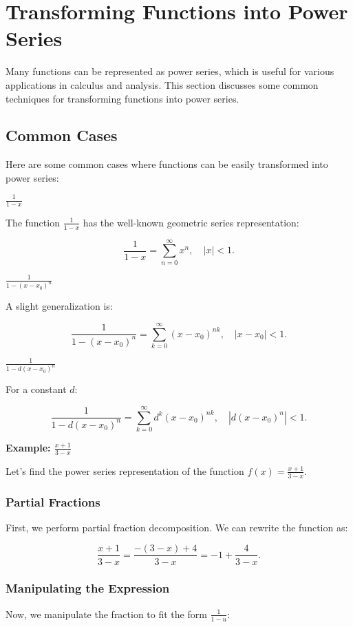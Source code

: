 \newpage
\section{Transforming Functions into Power Series}

Many functions can be represented as power series, which is useful for various applications in calculus 
and analysis. This section discusses some common techniques for transforming functions into power series.

\subsection{Common Cases}
Here are some common cases where functions can be easily transformed into power series:

\(\frac{1}{1 - x}\)

The function \(\frac{1}{1 - x}\) has the well-known geometric series representation:

\[
    \frac{1}{1 - x} = \sum_{n=0}^{\infty} x^n, \quad |x| < 1.
\]

\(\frac{1}{1 - {(x - x_0)}^n}\)

A slight generalization is:

\[
    \frac{1}{1 - {(x - x_0)}^n} = \sum_{k=0}^{\infty} {(x - x_0)}^{nk}, \quad |x - x_0| < 1.
\]

\(\frac{1}{1 - d{(x - x_0)}^n}\)

For a constant \(d\):

\[
    \frac{1}{1 - d{(x - x_0)}^n} = \sum_{k=0}^{\infty} d^k {(x - x_0)}^{nk}, \quad |d{(x - x_0)}^n| < 1.
\]

\textbf{Example: \(\frac{x + 1}{3 - x}\)}

Let's find the power series representation of the function \(f(x) = \frac{x + 1}{3 - x}\).

\subsubsection{Partial Fractions}

First, we perform partial fraction decomposition. We can rewrite the function as:

\[
    \frac{x + 1}{3 - x} = \frac{-(3 - x) + 4}{3 - x} = -1 + \frac{4}{3 - x}.
\]

\subsubsection{Manipulating the Expression}
Now, we manipulate the fraction to fit the form \(\frac{1}{1 - u}\):

